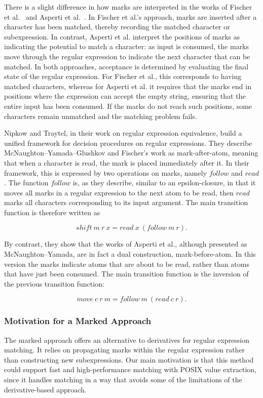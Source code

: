 \documentclass[12pt]{article}
\begin{document}
There is a slight difference in how marks are interpreted in the works of Fischer et al.~\cite{Fischer2010}  
and Asperti et al.~\cite{Asperti2010}.  
In Fischer et al.’s approach, marks are inserted after a character has been matched, thereby recording the matched character or subexpression.  
In contrast, Asperti et al. interpret the positions of marks as indicating the potential to match a character:  
as input is consumed, the marks move through the regular expression to indicate the next character that can be matched.  
In both approaches, acceptance is determined by evaluating the final state of the regular expression.  
For Fischer et al., this corresponds to having matched characters, whereas for Asperti et al. it requires that the marks end in positions  
where the expression can accept the empty string, ensuring that the entire input has been consumed.  
If the marks do not reach such positions, some characters remain unmatched and the matching problem fails.

Nipkow and Traytel, in their work on regular expression equivalence, 
build a unified framework for decision procedures on regular expressions. 
They describe McNaughton--Yamada--Glushkov and Fischer’s work as 
mark-after-atom, meaning that when a character is read, the mark is placed 
immediately after it. In their framework, this is expressed by two operations 
on marks, namely $follow$ and $read$. The function $follow$ is, as they 
describe, similar to an epsilon-closure, in that it moves all marks in a 
regular expression to the next atom to be read, then $read$ marks all 
characters corresponding to its input argument. The main transition function 
is therefore written as 

\[
shift\ m\ r\ x = read\ x\ (follow\ m\ r).
\] 

By contrast, they show that the works of Asperti et al., although presented 
as McNaughton--Yamada, are in fact a dual construction, mark-before-atom. 
In this version the marks indicate atoms that are about to be read, rather 
than atoms that have just been consumed. The main transition function is 
the inversion of the previous transition function:

\[
move\ c\ r\ m = follow\ m\ (read\ c\ r).
\]

\FloatBarrier
\subsubsection{Motivation for a Marked Approach}

The marked approach offers an alternative to derivatives for regular expression matching.  
It relies on propagating marks within the regular expression rather than constructing new subexpressions.  
Our main motivation is that this method could support fast and high-performance matching with POSIX value extraction,  
since it handles matching in a way that avoids some of the limitations of the derivative-based approach.  
\end{document}
